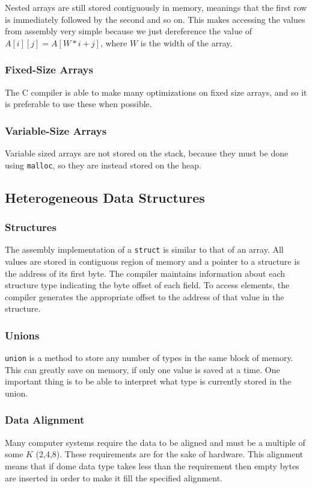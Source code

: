 \documentclass[10pt]{armath}
\newcommand{\s}[1]{\texttt{#1}}
\begin{document}
Nested arrays are still stored contiguously in memory, meanings that the first
row is immediately followed by the second and so on. This makes accessing the
values from assembly very simple because we just dereference the value of
$A[i][j] = A[W*i+j]$, where $W$ is the width of the array.

\subsubsection{Fixed-Size Arrays}%
\label{ssub:fixed_size_arrays}

The C compiler is able to make many optimizations on fixed size arrays, and so
it is preferable to use these when possible.

\subsubsection{Variable-Size Arrays}%
\label{ssub:variable_size_arrays}

Variable sized arrays are not stored on the stack, because they must be done
using \s{malloc}, so they are instead stored on the heap.

\subsection{Heterogeneous Data Structures}%
\label{sub:heterogeneous_data_structures}

\subsubsection{Structures}%
\label{ssub:structures}

The assembly implementation of a \s{struct} is similar to that of an array. All
values are stored in contiguous region of memory and a pointer to a structure
is the address of its first byte. The compiler maintains information about each
structure type indicating the byte offset of each field. To access elements,
the compiler generates the appropriate offset to the address of that value in
the structure.

\subsubsection{Unions}%
\label{ssub:unions}

\s{union} is a method to store any number of types in the same block of memory.
This can greatly save on memory, if only one value is saved at a time. One
important thing is to be able to interpret what type is currently stored in the
union.

\subsubsection{Data Alignment}%
\label{ssub:data_alignment}

Many computer systems require the data to be aligned and must be a multiple of
some $K$ (2,4,8). These requirements are for the sake of hardware. This
alignment means that if dome data type takes less than the requirement then
empty bytes are inserted in order to make it fill the specified alignment.

\end{document}
